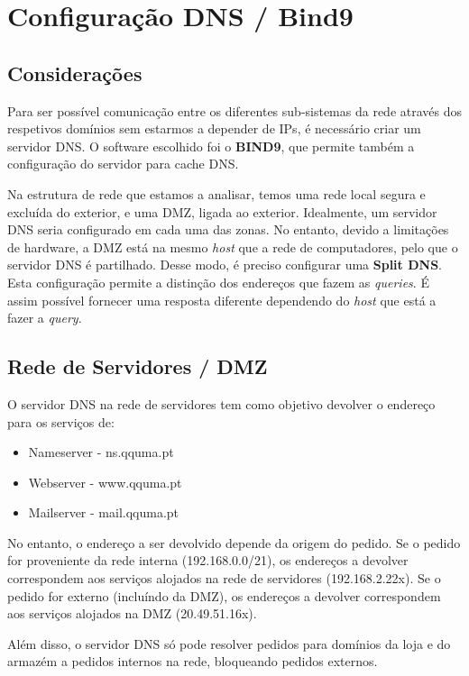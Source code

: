 \chapter{Configuração DNS / Bind9} \label{dns_conf}

\section{Considerações} \label{dns_intro}

Para ser possível comunicação entre os diferentes sub-sistemas da rede através dos respetivos domínios sem estarmos a depender de IPs, é necessário criar um servidor DNS.
O software escolhido foi o \textbf{BIND9}, que permite também a configuração do servidor para cache DNS.

Na estrutura de rede que estamos a analisar, temos uma rede local segura e excluída do exterior, e uma DMZ, ligada ao exterior.
Idealmente, um servidor DNS seria configurado em cada uma das zonas.
No entanto, devido a limitações de hardware, a DMZ está na mesmo \textit{host} que a rede de computadores, pelo que o servidor DNS é partilhado.
Desse modo, é preciso configurar uma \textbf{Split DNS}. Esta configuração permite a distinção dos endereços que fazem as \textit{queries}.
É assim possível fornecer uma resposta diferente dependendo do \textit{host} que está a fazer a \textit{query}.

\section{Rede de Servidores / DMZ} \label{dns_rede_servidores}

O servidor DNS na rede de servidores tem como objetivo devolver o endereço para os serviços de:
\begin{itemize}
    \item Nameserver - ns.qquma.pt
    \item Webserver - www.qquma.pt
    \item Mailserver - mail.qquma.pt
\end{itemize}

No entanto, o endereço a ser devolvido depende da origem do pedido.
Se o pedido for proveniente da rede interna (192.168.0.0/21), os endereços a devolver correspondem aos serviços alojados na rede de servidores (192.168.2.22x).
Se o pedido for externo (incluíndo da DMZ), os endereços a devolver correspondem aos serviços alojados na DMZ (20.49.51.16x).

Além disso, o servidor DNS só pode resolver pedidos para domínios da loja e do armazém a pedidos internos na rede, bloqueando pedidos externos.

